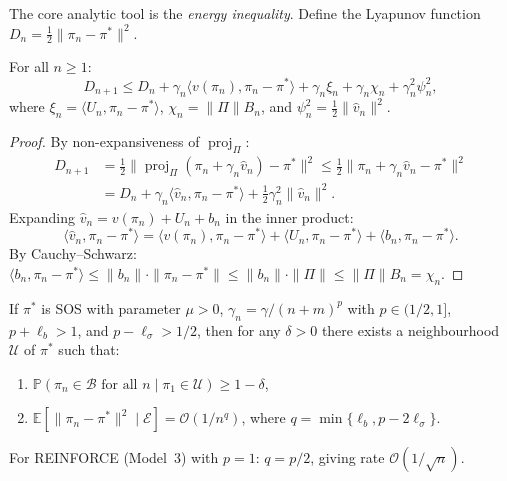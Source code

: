 The core analytic tool is the \emph{energy inequality}. Define the Lyapunov function $D_n = \frac{1}{2}\|\pi_n - \pi^*\|^2$.

\begin{lemma}
\label{lem:energy-ch3}
For all $n \geq 1$:
\begin{equation}
\label{eq:energy-ch3}
    D_{n+1} \leq D_n + \gamma_n \langle v(\pi_n), \pi_n - \pi^* \rangle + \gamma_n \xi_n + \gamma_n \chi_n + \gamma_n^2 \psi_n^2,
\end{equation}
where $\xi_n = \langle U_n, \pi_n - \pi^* \rangle$, $\chi_n = \|\Pi\| B_n$, and $\psi_n^2 = \frac{1}{2}\|\hat{v}_n\|^2$.
\end{lemma}

\begin{proof}
By non-expansiveness of $\operatorname{proj}_\Pi$:
\begin{align*}
    D_{n+1} &= \tfrac{1}{2}\|\operatorname{proj}_\Pi(\pi_n + \gamma_n \hat{v}_n) - \pi^*\|^2 \leq \tfrac{1}{2}\|\pi_n + \gamma_n \hat{v}_n - \pi^*\|^2 \\
    &= D_n + \gamma_n \langle \hat{v}_n, \pi_n - \pi^* \rangle + \tfrac{1}{2}\gamma_n^2 \|\hat{v}_n\|^2.
\end{align*}
Expanding $\hat{v}_n = v(\pi_n) + U_n + b_n$ in the inner product:
\[
    \langle \hat{v}_n, \pi_n - \pi^* \rangle = \langle v(\pi_n), \pi_n - \pi^* \rangle + \langle U_n, \pi_n - \pi^* \rangle + \langle b_n, \pi_n - \pi^* \rangle.
\]
By Cauchy--Schwarz: $\langle b_n, \pi_n - \pi^* \rangle \leq \|b_n\| \cdot \|\pi_n - \pi^*\| \leq \|b_n\| \cdot \|\Pi\| \leq \|\Pi\| B_n = \chi_n$.
\end{proof}


\begin{theorem}
\label{thm:giannou-ch3}
If $\pi^*$ is SOS with parameter $\mu > 0$, $\gamma_n = \gamma/(n+m)^p$ with $p \in (1/2, 1]$, $p + \ell_b > 1$, and $p - \ell_\sigma > 1/2$, then for any $\delta > 0$ there exists a neighbourhood $\mathcal{U}$ of $\pi^*$ such that:
\begin{enumerate}
    \item $\mathbb{P}(\pi_n \in \mathcal{B} \text{ for all } n \mid \pi_1 \in \mathcal{U}) \geq 1 - \delta$,
    \item $\mathbb{E}[\|\pi_n - \pi^*\|^2 \mid \mathcal{E}] = \mathcal{O}(1/n^q)$, where $q = \min\{\ell_b, p - 2\ell_\sigma\}$.
\end{enumerate}
For REINFORCE (Model~3) with $p = 1$: $q = p/2$, giving rate $\mathcal{O}(1/\sqrt{n})$.
\end{theorem}

